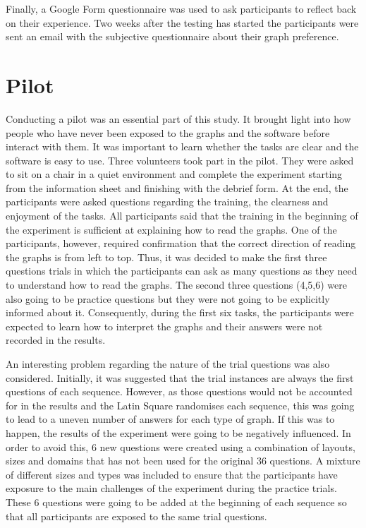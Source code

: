 \documentclass{l4proj}
\begin{document}
Finally, a Google Form questionnaire was used to ask participants to reflect back on their experience. Two weeks after the testing has started the participants were sent an email with the subjective questionnaire about their graph preference. 

\section{Pilot}

Conducting a pilot was an essential part of this study. It brought light into how people who have never been exposed to the graphs and the software before interact with them. It was important to learn whether the tasks are clear and the software is easy to use. Three volunteers took part in the pilot. They were asked to sit on a chair in a quiet environment and complete the experiment starting from the information sheet and finishing with the debrief form. At the end, the participants were asked questions regarding the training, the clearness and enjoyment of the tasks. All participants said that the training in the beginning of the experiment is sufficient at explaining how to read the graphs. One of the participants, however, required confirmation that the correct direction of reading the graphs is from left to top. Thus, it was decided to make the first three questions trials in which the participants can ask as many questions as they need to understand how to read the graphs. The second three questions (4,5,6) were also going to be practice questions but they were not going to be explicitly informed about it. Consequently, during the first six tasks, the participants were expected to learn how to interpret the graphs and their answers were not recorded in the results. 

An interesting problem regarding the nature of the trial questions was also considered. Initially, it was suggested that the trial instances are always the first questions of each sequence. However, as those questions would not be accounted for in the results and the Latin Square randomises each sequence, this was going to lead to a uneven number of answers for each type of graph. If this was to happen, the results of the experiment were going to be negatively influenced. In order to avoid this, 6 new questions were created using a combination of layouts, sizes and domains that has not been used for the original 36 questions. A mixture of different sizes and types was included to ensure that the participants have exposure to the main challenges of the experiment during the practice trials. These 6 questions were going to be added at the beginning of each sequence so that all participants are exposed to the same trial questions.  
\end{document}
